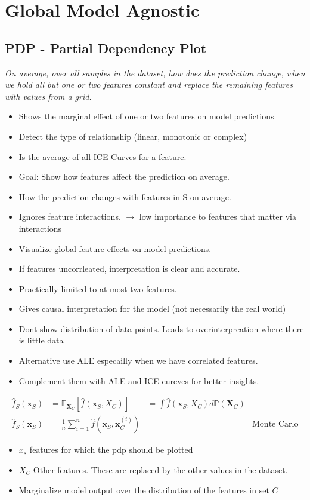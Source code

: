 \section{Global Model Agnostic}

\subsection{PDP - Partial Dependency Plot}
\textit{On average, over all samples in the dataset, how does the prediction change,
	when we hold all but one or two features constant and replace the remaining features with values from a grid.}
\begin{itemize}
	\item Shows the marginal effect of one or two features on model predictions
	\item Detect the type of relationship (linear, monotonic or complex)
	\item Is the average of all ICE-Curves for a feature.
	\item Goal: Show how features affect the prediction on average.
	\item How the prediction changes with features in S on average.
	\item Ignores feature interactions. $\to$ low importance to features that matter via interactions
	\item Visualize global feature effects on model predictions.
	\item If features uncorrleated, interpretation is clear and accurate.
	\item Practically limited to at most two features.
	\item Gives causal interpretation for the model (not necessarily the real world)
	\item Dont show distribution of data points. Leads to overinterpreation where there is little data
	\item Alternative use ALE especailly when we have correlated features.
	\item Complement them with ALE and ICE cureves for better insights.
\end{itemize}

\begin{align}
	\hat{f}_S(\mathbf{x}_S) & = \mathbb{E}_{\mathbf{X}_C}\left[\hat{f}(\mathbf{x}_S, X_C)\right]     & = \int \hat{f}(\mathbf{x}_S, X_C) d\mathbb{P}(\mathbf{X}_C)                      \\
	\hat{f}_S(\mathbf{x}_S) & = \frac{1}{n} \sum_{i=1}^n \hat{f}(\mathbf{x}_S, \mathbf{x}^{(i)}_{C}) &                                                             & \text{Monte Carlo}
\end{align}
\begin{itemize}
	\item $x_s$ features for which the pdp should be plotted
	\item $X_C$ Other features. These are replaced by the other values in the dataset.
	\item Marginalize model output over the distribution of the features in set $C$
\end{itemize}


